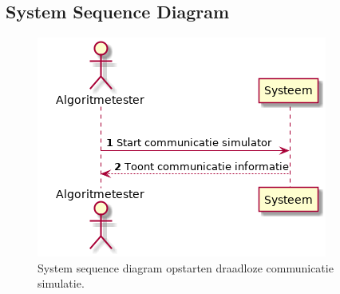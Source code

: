 \documentclass[a4paper, 11pt, oneside]{report}
\begin{document}
%

\label{Usecase:simmulatiecommuicatie:fully-dressed}
\subsection{System Sequence Diagram }
\label{Usecase:simmulatiecommuicatie:systemsequence}

\begin{figure}[H]
	\begin{center}\includegraphics[height=.2\textheight]{UML/out/usecase/sequence/Simulerendraadlozecommunicatie/Simulerendraadlozecommunicatie.png}\end{center}
	\caption{System sequence diagram opstarten draadloze communicatie simulatie.}
	\label{fig:simmulatiecommuicatie:systemsequence}
\end{figure}
\end{document}
